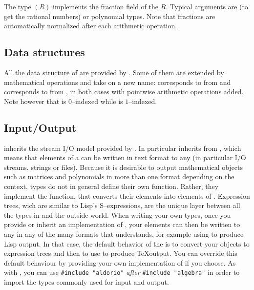 The type $(R)$ implements the fraction field of
the  $R$. Typical arguments are 
(to get the rational numbers) or polynomial types. Note that fractions
are automatically normalized after each arithmetic operation.


\subsection{Data structures}
All the data structure of \libalgebra{} are provided by \libaldor. Some of them
are extended by mathematical operations and take on a new name:
 corresponds to  from \libaldor{} and
 corresponds to  from \libaldor,
in both cases with pointwise arithmetic operations added.
Note however that  is $0$--indexed while 
is $1$--indexed.

\subsection{Input/Output}
\label{sec:inputoutput}
\libalgebra{} inherits the stream I/O model provided by \libaldor. In particular
 inherits  from \libaldor, which means
that elements of a  can be written in text format
to any  (in particular I/O streams, strings or files).
Because it is desirable to output mathematical objects such as
matrices and polynomials in more than one format depending on the
context, \libalgebra{} types do not in general define their own
 function. Rather, they implement
the  function, that converts their elements
into elements of . Expression trees,
wich are similar to Lisp's S--expressions, are the unique layer
between all the types in \libalgebra{} and the outside world. When
writing your own types, once you provide or inherit an implementation
of , your elements can then be written
to any  in any of the many formats that
 understands, for example using
 to produce Lisp output.
In that case, the default behavior of the 
is to convert your objects to expression trees and then to
use  to produce \TeX output. You
can override this default behaviour by providing your own
implementation of  if you choose.
As with \libaldor, you can use {\tt \#include "aldorio"} {\em after}
{\tt \#include "algebra"} in order to import the types commonly used
for input and output.

